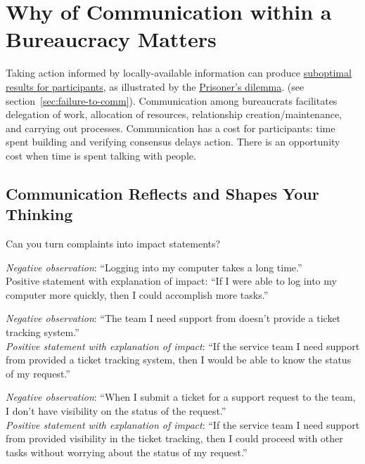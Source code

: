 \section{Why of Communication within a Bureaucracy Matters}

Taking action informed by locally-available information can produce \hyperref[sec:failure-to-comm]{suboptimal results for participants}, as illustrated by the
\href{https://en.wikipedia.org/wiki/Prisoner\%27s\_dilemma}{Prisoner's dilemma}.
\ifsectionref
(see section~\ref{sec:failure-to-comm}). 
\fi
Communication among bureaucrats facilitates delegation of work, allocation of resources, relationship creation/maintenance, and carrying out processes. Communication has a cost for participants: time spent building and verifying consensus delays action. There is an opportunity cost when time is spent talking with people.




\subsection*{Communication Reflects and Shapes Your Thinking}

Can you turn complaints into impact statements? 

\textit{Negative observation}: ``Logging into my computer takes a long time.''\\
Positive statement with explanation of impact: ``If I were able to log into my computer more quickly, then I could accomplish more tasks.''

\textit{Negative observation}: ``The team I need support from doesn't provide a ticket tracking system.''\\
\textit{Positive statement with explanation of impact}: ``If the service team I need support from provided a ticket tracking system, then I would be able to know the status of my request.''

\textit{Negative observation}: ``When I submit a ticket for a support request to the team, I don't have visibility on the status of the request.''\\
\textit{Positive statement with explanation of impact}: ``If the service team I need support from provided visibility in the ticket tracking, then I could proceed with other tasks without worrying about the status of my request.''


